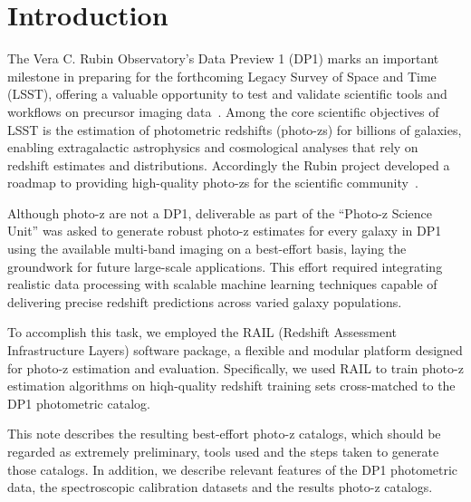 \section{Introduction}
\label{sec:intro:0}

The Vera C. Rubin Observatory’s Data Preview 1 (DP1) marks an important milestone in preparing for the forthcoming Legacy Survey of Space and Time (LSST), offering a valuable opportunity to test and validate scientific tools and workflows on precursor imaging data~\citep{RTN:095}. Among the core scientific objectives of LSST is the estimation of photometric redshifts (photo-zs) for billions of galaxies, enabling extragalactic astrophysics and cosmological analyses that rely on redshift estimates and distributions.  Accordingly the Rubin project developed a roadmap to providing high-quality photo-zs for the scientific community~\citep{DMTN:049}.

Although photo-z are not a DP1, deliverable as part of the ``Photo-z Science Unit'' was asked to generate robust photo-z estimates for every galaxy in DP1 using the available multi-band imaging on a best-effort basis, laying the groundwork for future large-scale applications.  This effort required integrating realistic data processing with scalable machine learning techniques capable of delivering precise redshift predictions across varied galaxy populations.

To accomplish this task, we employed the RAIL (Redshift Assessment Infrastructure Layers) software package, a flexible and modular platform designed for photo-z estimation and evaluation\citep{RAIL}.  Specifically, we used RAIL to train photo-z estimation algorithms on hiqh-quality redshift training sets cross-matched to the DP1 photometric catalog.  

This note describes the resulting best-effort photo-z catalogs, which should be regarded as extremely preliminary, tools used and the steps taken to generate those catalogs.  In addition, we describe relevant features of the DP1 photometric data, the spectroscopic calibration datasets and the results photo-z catalogs.  


